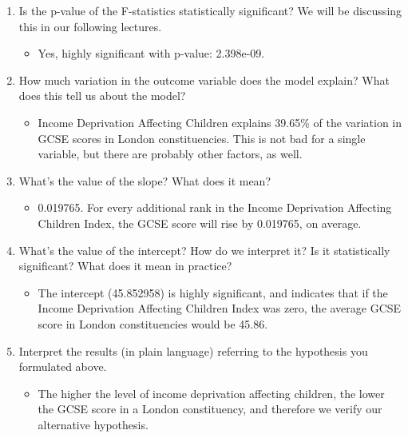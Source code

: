 \documentclass[12pt,a4paper]{article}
\providecommand{\tightlist}{%
  \setlength{\itemsep}{0pt}\setlength{\parskip}{0pt}}
\begin{document}
\begin{enumerate}
\def\labelenumi{\arabic{enumi}.}
\tightlist
\item
  Is the p-value of the F-statistics statistically significant? We will
  be discussing this in our following lectures.

  \begin{itemize}
  \tightlist
  \item
    Yes, highly significant with p-value: 2.398e-09.
  \end{itemize}
\item
  How much variation in the outcome variable does the model explain?
  What does this tell us about the model?

  \begin{itemize}
  \tightlist
  \item
    Income Deprivation Affecting Children explains 39.65\% of the
    variation in GCSE scores in London constituencies. This is not bad
    for a single variable, but there are probably other factors, as
    well.
  \end{itemize}
\item
  What's the value of the slope? What does it mean?

  \begin{itemize}
  \tightlist
  \item
    0.019765. For every additional rank in the Income Deprivation
    Affecting Children Index, the GCSE score will rise by 0.019765, on
    average.
  \end{itemize}
\item
  What's the value of the intercept? How do we interpret it? Is it
  statistically significant? What does it mean in practice?

  \begin{itemize}
  \tightlist
  \item
    The intercept (45.852958) is highly significant, and indicates that
    if the Income Deprivation Affecting Children Index was zero, the
    average GCSE score in London constituencies would be 45.86.
  \end{itemize}
\item
  Interpret the results (in plain language) referring to the hypothesis
  you formulated above.

  \begin{itemize}
  \tightlist
  \item
    The higher the level of income deprivation affecting children, the
    lower the GCSE score in a London constituency, and therefore we
    verify our alternative hypothesis.
  \end{itemize}
\end{enumerate}


\printbibliography[title=List of References]
\end{document}
